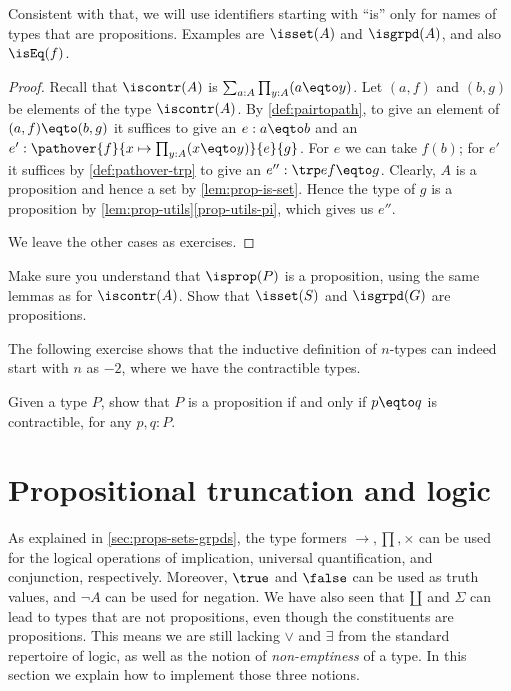 Consistent with that, we will use identifiers starting with ``is'' only for names of types
that are propositions. Examples are $\isset(A)$ and $\isgrpd(A)$,
and also $\isEq(f)$.

\begin{proof}
Recall that $\iscontr(A)$ is $\sum_{a:A} \prod_{y:A} (a \eqto y)$.
Let $(a,f)$ and $(b,g)$ be elements of the type $\iscontr(A)$.
By \cref{def:pairtopath}, to give an element of $(a,f) \eqto (b,g)$ it suffices
to give an $e : a \eqto b$ and an $e' : \pathover{f}{x\mapsto\prod_{y:A} (x \eqto y)}{e}{g}$.
For $e$ we can take $f(b)$; for $e'$ it suffices by \cref{def:pathover-trp}
to give an $e'' : \trp e f \eqto g$. Clearly, $A$ is a proposition and hence
a set by \cref{lem:prop-is-set}. Hence the type of $g$ is a proposition
by \cref{lem:prop-utils}\ref{prop-utils-pi}, which gives us $e''$.

We leave the other cases as exercises.
\end{proof}

\begin{xca}\label{xca:isX-is-prop}
Make sure you understand that $\isprop(P)$ is a proposition,
using the same lemmas as for $\iscontr(A)$.
Show that $\isset(S)$ and $\isgrpd(G)$ are propositions.
\end{xca}

The following exercise shows that the inductive definition of $n$-types can
indeed start with $n$ as $-2$, where we have the contractible types.

\begin{xca}\label{xca:prop-contractible=}
Given a type $P$, show that $P$ is a proposition if and only if $p \eqto q$ is contractible,
for any $p, q: P$.
\end{xca}


\section{Propositional truncation and logic}
\label{sec:prop-trunc}

As explained in \cref{sec:props-sets-grpds},
the type formers $\to,\prod,\times$
can be used for the logical operations of implication,
universal quantification, and conjunction, respectively.
Moreover, $\true$ and $\false$ can be used as truth values,
and $\neg A$ can be used for negation.
We have also seen that ${\amalg}$ and $\Sigma$ can lead to types
that are not propositions, even though the constituents are
propositions. This means we are still lacking $\vee$ and $\exists$
from the standard repertoire of logic, as well as the notion of \emph{non-emptiness} of a type.
In this section we explain how to implement those three notions.


